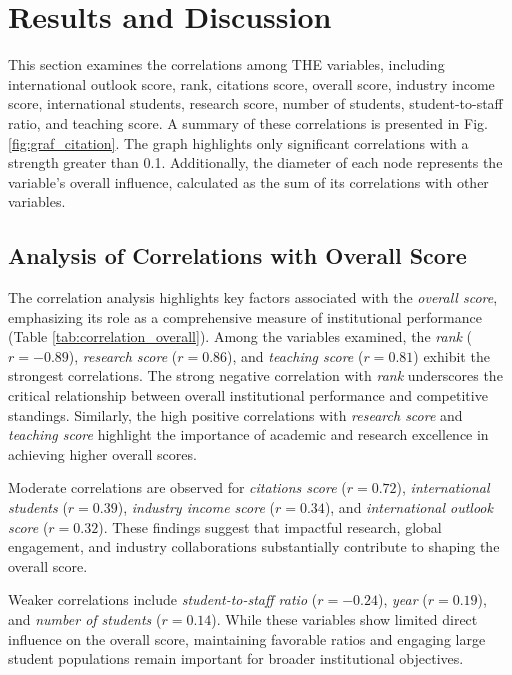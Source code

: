 \documentclass[sigconf]{acmart}
\begin{document}
\section{Results and Discussion}
This section examines the correlations among THE variables, including international outlook score, rank, citations score, overall score, industry income score, international students, research score, number of students, student-to-staff ratio, and teaching score. A summary of these correlations is presented in Fig. \ref{fig:graf_citation}. The graph highlights only significant correlations with a strength greater than 0.1. Additionally, the diameter of each node represents the variable's overall influence, calculated as the sum of its correlations with other variables.


\subsection{Analysis of Correlations with Overall Score}

The correlation analysis highlights key factors associated with the \textit{overall score}, emphasizing its role as a comprehensive measure of institutional performance (Table \ref{tab:correlation_overall}). Among the variables examined, the \textit{rank} ($r = -0.89$), \textit{research score} ($r = 0.86$), and \textit{teaching score} ($r = 0.81$) exhibit the strongest correlations. The strong negative correlation with \textit{rank} underscores the critical relationship between overall institutional performance and competitive standings. Similarly, the high positive correlations with \textit{research score} and \textit{teaching score} highlight the importance of academic and research excellence in achieving higher overall scores.

Moderate correlations are observed for \textit{citations score} ($r = 0.72$), \textit{international students} ($r = 0.39$), \textit{industry income score} ($r = 0.34$), and \textit{international outlook score} ($r = 0.32$). These findings suggest that impactful research, global engagement, and industry collaborations substantially contribute to shaping the overall score.

Weaker correlations include \textit{student-to-staff ratio} ($r = -0.24$), \textit{year} ($r = 0.19$), and \textit{number of students} ($r = 0.14$). While these variables show limited direct influence on the overall score, maintaining favorable ratios and engaging large student populations remain important for broader institutional objectives.
\end{document}
